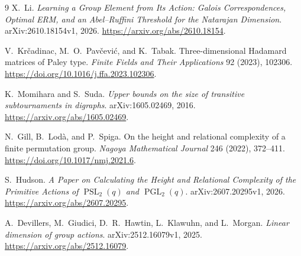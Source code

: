 \documentclass[11pt,a4paper]{article}
\DeclareMathOperator{\PSL}{PSL}
\DeclareMathOperator{\PGL}{PGL}
\begin{document}
\begin{thebibliography}{9}\small
{} X.~Li.
\emph{Learning a Group Element from Its Action: Galois Correspondences,
Optimal ERM, and an Abel--Ruffini Threshold for the Natarajan Dimension}.
arXiv:2610.18154v1, 2026. \url{https://arxiv.org/abs/2610.18154}.

 V.~Kr\v{c}adinac, M.~O.~Pav\v{c}evi\'{c}, and K.~Tabak.
Three-dimensional Hadamard matrices of Paley type.
\emph{Finite Fields and Their Applications} 92 (2023), 102306.
\url{https://doi.org/10.1016/j.ffa.2023.102306}.

 K.~Momihara and S.~Suda.
\emph{Upper bounds on the size of transitive subtournaments in digraphs}.
arXiv:1605.02469, 2016. \url{https://arxiv.org/abs/1605.02469}.

 N.~Gill, B.~Lod\`a, and P.~Spiga.
On the height and relational complexity of a finite permutation group.
\emph{Nagoya Mathematical Journal} 246 (2022), 372--411.
\url{https://doi.org/10.1017/nmj.2021.6}.

 S.~Hudson.
\emph{A Paper on Calculating the Height and Relational Complexity of the
Primitive Actions of $\PSL_2(q)$ and $\PGL_2(q)$}.
arXiv:2607.20295v1, 2026. \url{https://arxiv.org/abs/2607.20295}.

 A.~Devillers, M.~Giudici, D.~R.~Hawtin, L.~Klawuhn,
and L.~Morgan. \emph{Linear dimension of group actions}.
arXiv:2512.16079v1, 2025. \url{https://arxiv.org/abs/2512.16079}.
\end{thebibliography}
\end{document}
